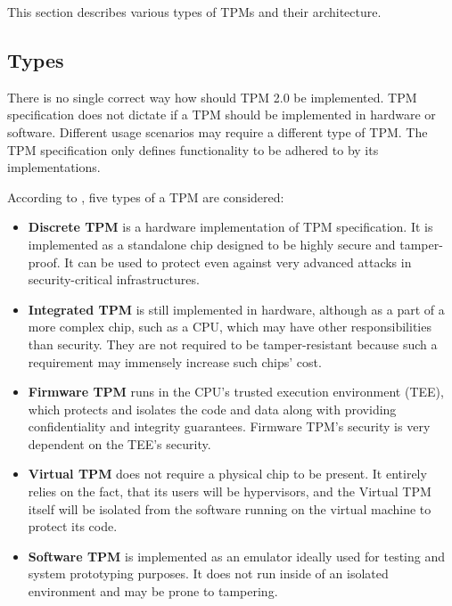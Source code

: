 This section describes various types of TPMs and their architecture.

\subsection{Types}
There is no single correct way how should TPM 2.0 be implemented. TPM specification does not dictate if a TPM should be implemented in hardware or software. Different usage scenarios may require a different type of TPM. The TPM specification only defines functionality to be adhered to by its implementations. 

According to \cite{tcg_tpm2_briefintro}, five types of a TPM are considered:

\begin{itemize}
    \item \textbf{Discrete TPM} is a hardware implementation of TPM specification. It is implemented as a standalone chip designed to be highly secure and tamper-proof. It can be used to protect even against very advanced attacks in security-critical infrastructures.
    \item \textbf{Integrated TPM} is still implemented in hardware, although as a part of a more complex chip, such as a CPU, which may have other responsibilities than security. They are not required to be tamper-resistant because such a requirement may immensely increase such chips' cost.
    \item \textbf{Firmware TPM} runs in the CPU's trusted execution environment (TEE), which protects and isolates the code and data along with providing confidentiality and integrity guarantees. Firmware TPM's security is very dependent on the TEE's security.
    \item \textbf{Virtual TPM} does not require a physical chip to be present. It entirely relies on the fact, that its users will be hypervisors, and the Virtual TPM itself will be isolated from the software running on the virtual machine to protect its code. 
    \item \textbf{Software TPM} is implemented as an emulator ideally used for testing and system prototyping purposes. It does not run inside of an isolated environment and may be prone to tampering.
\end{itemize}




